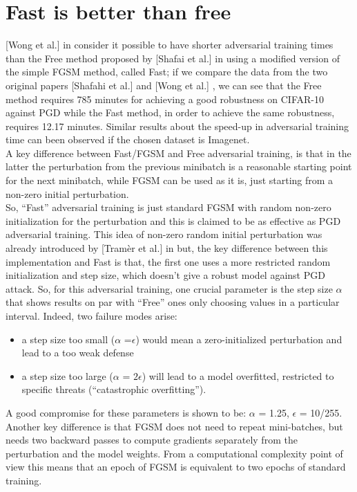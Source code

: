 \documentclass{article}
\begin{document}
\section{Fast is better than free}

[Wong et al.] in \cite{WongEtAl2020} consider it possible to have shorter
adversarial training times than the Free method proposed by [Shafai et al.] in
\cite{ShafahiEtAl2019b} using a modified version of the simple FGSM method,
called Fast; if we compare the data from the two original papers [Shafahi et
al.] \cite{ShafahiEtAl2019b} and [Wong et al.] \cite{WongEtAl2020}, we can see
that the Free method requires 785 minutes for achieving a good robustness on
CIFAR-10 against PGD while the Fast method, in order to achieve the same
robustness, requires 12.17 minutes. Similar results about the speed-up in
adversarial training time can been observed if the chosen dataset is Imagenet.\\
A key difference between Fast/FGSM and Free adversarial training, is that in the
latter the perturbation from the previous minibatch is a reasonable starting
point for the next minibatch, while FGSM can be used as it is, just starting
from a non-zero initial perturbation.\\
So, “Fast” adversarial training is just standard FGSM with random non-zero
initialization for the perturbation and this is claimed to be as effective as
PGD adversarial training. This idea of non-zero random initial perturbation was
already introduced by [Tramèr et al.] in \cite{TramerEtAl2017} but, the key
difference between this implementation and Fast is that, the first one uses a
more restricted random initialization and step size, which doesn't give a robust
model against PGD attack.  So, for this adversarial training, one crucial
parameter is the step size $\alpha$ that shows results on par with “Free” ones
only choosing values in a particular interval. Indeed, two failure modes arise:

\begin{itemize}

\item a step size too small ($\alpha$ =$\epsilon$) would mean a zero-initialized
perturbation and lead to a too weak defense
\item a step size too large ($\alpha$ = $2\epsilon$) will lead to a model
overfitted, restricted to specific threats (“catastrophic overfitting”).
\end{itemize}

A good compromise for these parameters is shown to be: $\alpha$ = 1.25,
$\epsilon$ = 10/255.\\
Another key difference is that FGSM does not need to repeat mini-batches, but
needs two backward passes to compute gradients separately from the perturbation
and the model weights. From a computational complexity point of view this means
that an epoch of FGSM is equivalent to two epochs of standard training.
\end{document}
